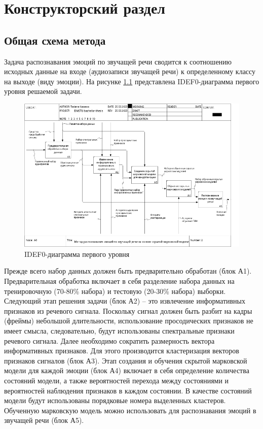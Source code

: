 \chapter{Конструкторский раздел}
\section{Общая схема метода}
Задача распознавания эмоций по звучащей речи сводится к соотношению исходных данные на входе (аудиозаписи звучащей речи) к определенному классу на выходе (виду эмоции). На рисунке \ref{fig:idef1} представлена IDEF0-диаграмма первого уровня решаемой задачи.
\begin{figure}[H]
	\centering
	\includegraphics[width=\linewidth]{assets/02_A0.png}
	\caption{IDEF0-диаграмма первого уровня}
	\label{fig:idef1}
\end{figure}
Прежде всего набор данных должен быть предварительно обработан (блок А1).  Предварительная обработка включает в себя разделение набора данных на тренировочную (70-80\% набора) и тестовую (20-30\% набора) выборки.
Следующий этап решения задачи (блок А2) -- это извлечение информативных признаков из речевого сигнала. Поскольку сигнал должен быть разбит на кадры (фреймы) небольшой длительности, использование просодических признаков не имеет смысла, следовательно, будут использованы спектральные признаки речевого сигнала. Далее необходимо сократить размерность вектора информативных признаков. Для этого производится кластеризация векторов признаков сигналов (блок А3).  Этап создания и обучения скрытой марковской модели для каждой эмоции (блок А4) включает в себя определение количества состояний модели, а также вероятностей перехода между состояниями и вероятностей наблюдения признаков в каждом состоянии. В качестве состояний модели будут использованы порядковые номера выделенных кластеров. Обученную марковскую модель можно использовать для распознавания эмоций в звучащей речи (блок А5).
